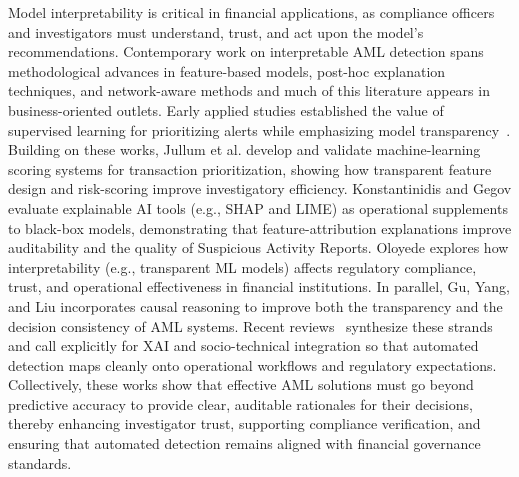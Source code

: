 Model interpretability is critical in financial applications, as compliance officers and investigators must understand, trust, and act upon the model’s recommendations. Contemporary work on interpretable AML detection spans methodological advances in feature-based models, post-hoc explanation techniques, and network-aware methods and much of this literature appears in business-oriented outlets. Early applied studies established the value of supervised learning for prioritizing alerts while emphasizing model transparency~\parencite{chen2018machine, han2020artificial}. Building on these works, Jullum et al. \parencite*{jullum2020detecting} develop and validate machine-learning scoring systems for transaction prioritization, showing how transparent feature design and risk-scoring improve investigatory efficiency. Konstantinidis and Gegov \parencite*{konstantinidis2024deep} evaluate explainable AI tools (e.g., SHAP and LIME) as operational supplements to black-box models, demonstrating that feature-attribution explanations improve auditability and the quality of Suspicious Activity Reports. Oloyede \parencite*{oloyede2025evaluating} explores how interpretability (e.g., transparent ML models) affects regulatory compliance, trust, and operational effectiveness in financial institutions.  In parallel, Gu, Yang, and Liu \parencite*{gu2025optimization} incorporates causal reasoning to improve both the transparency and the decision consistency of AML systems. Recent reviews~\parencite{mazumder2025explainable} synthesize these strands and call explicitly for XAI and socio-technical integration so that automated detection maps cleanly onto operational workflows and regulatory expectations. Collectively, these works show that effective AML solutions must go beyond predictive accuracy to provide clear, auditable rationales for their decisions, thereby enhancing investigator trust, supporting compliance verification, and ensuring that automated detection remains aligned with financial governance standards.


